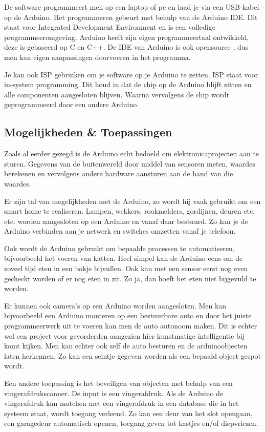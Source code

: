 \documentclass[a4paper, dutch, abstract=true]{scrartcl}
\begin{document}
De software programmeert men op een laptop of pc en laad je via een USB-kabel op de Arduino.
Het programmeren gebeurt met behulp van de Arduino IDE.
Dit staat voor Integrated Development Environment en is een volledige programmeeromgeving.
Arduino heeft zijn eigen programmeertaal ontwikkeld, deze is gebaseerd op C en C++.
De IDE van Arduino is ook opensource \cite{arduino2019github}, dus men kan eigen aanpassingen
doorvoeren in het programma.

Je kan ook ISP gebruiken om je software op je Arduino te zetten.
ISP staat voor in-system programming.
Dit houd in dat de chip op de Arduino blijft zitten en alle componenten aangesloten blijven.
Waarna vervolgens de chip wordt geprogrammeerd door een andere Arduino.

\subsection{Mogelijkheden \& Toepassingen}
Zoals al eerder gezegd is de Arduino echt bedoeld om elektronicaprojecten aan te sturen.
Gegevens van de buitenwereld door middel van sensoren meten, waardes berekenen en vervolgens andere
hardware aansturen aan de hand van die waardes.

Er zijn tal van mogelijkheden met de Arduino, zo wordt hij vaak gebruikt om een smart home te
realiseren.
Lampen, wekkers, rookmelders, gordijnen, deuren etc. etc. worden aangesloten op een Arduino en vanaf
daar bestuurd.
Zo kan je de Arduino verbinden aan je netwerk en switches omzetten vanaf je telefoon. 

Ook wordt de Arduino gebruikt om bepaalde processen te automatiseren, bijvoorbeeld het voeren van
katten.
Heel simpel kan de Arduino eens om de zoveel tijd eten in een bakje bijvullen.
Ook kan met een sensor eerst nog even gecheckt worden of er nog eten in zit.
Zo ja, dan hoeft het eten niet bijgevuld te worden.

Er kunnen ook camera's op een Arduino worden aangesloten.
Men kan bijvoorbeeld een Arduino monteren op een bestuurbare auto en door het juiste programmeerwerk
uit te voeren kan men de auto autonoom maken.
Dit is echter wel een project voor gevorderden aangezien hier kunstmatige intelligentie bij komt
kijken.
Men kan echter ook zelf de auto besturen en de arduinoobjecten laten herkennen.
Zo kan een seintje gegeven worden als een bepaald object gespot wordt.

Een andere toepassing is het beveiligen van objecten met behulp van een vingerafdrukscanner.
De input is een vingerafdruk.
Als de Arduino de vingerafdruk kan matchen met een vingerafdruk in een database die in het systeem
staat, wordt toegang verleend.
Zo kan een deur van het slot opengaan, een garagedeur automatisch openen, toegang geven tot kastjes
en/of diepvriezen.
\end{document}
